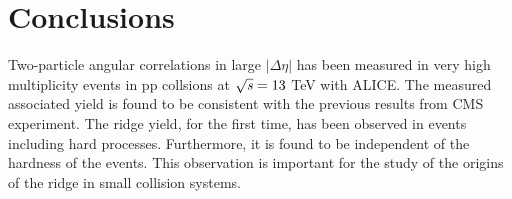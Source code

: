 
\section{Conclusions}
\label{sec:summary}

Two-particle angular correlations in large $|\Delta\eta|$ has been measured in very high multiplicity events in pp collsions at $\sqrt{\it{s}}=13$ TeV with ALICE. The measured associated yield is found to be consistent with the previous results from CMS experiment. The ridge yield, for the first time, has been observed in events including hard processes. Furthermore, it is found to be independent of the hardness of the events. This observation is important for the study of the origins of the ridge in small collision systems.

